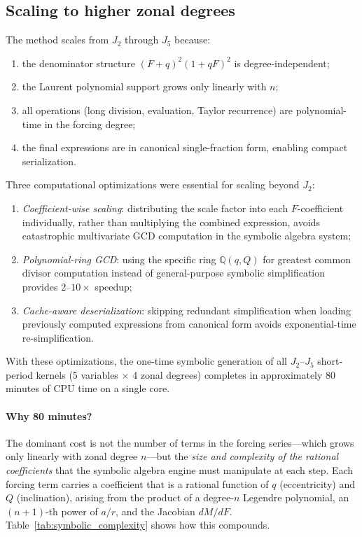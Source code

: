 \documentclass[11pt]{article}
\begin{document}
\subsection{Scaling to higher zonal degrees}

The method scales from $J_2$ through $J_5$ because:
\begin{enumerate}
    \item the denominator structure $(F+q)^2(1+qF)^2$ is degree-independent;
    \item the Laurent polynomial support grows only linearly with $n$;
    \item all operations (long division, evaluation, Taylor recurrence) are
    polynomial-time in the forcing degree;
    \item the final expressions are in canonical single-fraction form,
    enabling compact serialization.
\end{enumerate}

Three computational optimizations were essential for scaling beyond $J_2$:
\begin{enumerate}
    \item \emph{Coefficient-wise scaling}: distributing the scale factor into
    each $F$-coefficient individually, rather than multiplying the combined
    expression, avoids catastrophic multivariate GCD computation in the
    symbolic algebra system;
    \item \emph{Polynomial-ring GCD}: using the specific ring
    $\mathbb{Q}(q, Q)$ for greatest common divisor computation instead of
    general-purpose symbolic simplification provides $2$--$10\times$ speedup;
    \item \emph{Cache-aware deserialization}: skipping redundant
    simplification when loading previously computed expressions from canonical
    form avoids exponential-time re-simplification.
\end{enumerate}

With these optimizations, the one-time symbolic generation of all
$J_2$--$J_5$ short-period kernels (5 variables $\times$ 4 zonal degrees)
completes in approximately 80 minutes of CPU time on a single core.

\paragraph{Why 80 minutes?}
The dominant cost is not the number of terms in the forcing series---which
grows only linearly with zonal degree $n$---but the \emph{size and
complexity of the rational coefficients} that the symbolic algebra engine
must manipulate at each step.  Each forcing term carries a coefficient that
is a rational function of $q$ (eccentricity) and $Q$ (inclination),
arising from the product of a degree-$n$ Legendre polynomial, an
$(n+1)$-th power of $a/r$, and the Jacobian $dM/dF$.
Table~\ref{tab:symbolic_complexity} shows how this compounds.
\end{document}
